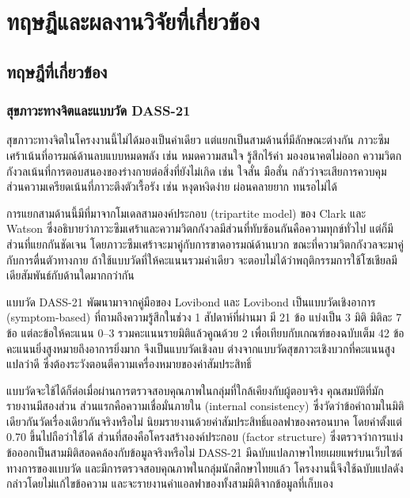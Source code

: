 \section{ทฤษฎีและผลงานวิจัยที่เกี่ยวข้อง}


\subsection{ทฤษฎีที่เกี่ยวข้อง}

\subsubsection*{สุขภาวะทางจิตและแบบวัด DASS-21}

สุขภาวะทางจิตในโครงงานนี้ไม่ได้มองเป็นค่าเดียว แต่แยกเป็นสามด้านที่มีลักษณะต่างกัน
ภาวะซึมเศร้าเน้นที่อารมณ์ด้านลบแบบหมดพลัง เช่น หมดความสนใจ รู้สึกไร้ค่า มองอนาคตไม่ออก
ความวิตกกังวลเน้นที่การตอบสนองของร่างกายต่อสิ่งที่ยังไม่เกิด เช่น ใจสั่น มือสั่น กลัวว่าจะเสียการควบคุม
ส่วนความเครียดเน้นที่ภาวะตึงตัวเรื้อรัง เช่น หงุดหงิดง่าย ผ่อนคลายยาก ทนรอไม่ได้

การแยกสามด้านนี้มีที่มาจากโมเดลสามองค์ประกอบ (tripartite model) ของ Clark และ Watson
\cite{clark1991tripartite} ซึ่งอธิบายว่าภาวะซึมเศร้าและความวิตกกังวลมีส่วนที่ทับซ้อนกันคือความทุกข์ทั่วไป
แต่ก็มีส่วนที่แยกกันชัดเจน โดยภาวะซึมเศร้าจะมาคู่กับการขาดอารมณ์ด้านบวก
ขณะที่ความวิตกกังวลจะมาคู่กับการตื่นตัวทางกาย
ถ้าใช้แบบวัดที่ให้คะแนนรวมค่าเดียว
จะตอบไม่ได้ว่าพฤติกรรมการใช้โซเชียลมีเดียสัมพันธ์กับด้านใดมากกว่ากัน

แบบวัด DASS-21 พัฒนามาจากคู่มือของ Lovibond และ Lovibond \cite{lovibond1995manual}
เป็นแบบวัดเชิงอาการ (symptom-based) ที่ถามถึงความรู้สึกในช่วง 1 สัปดาห์ที่ผ่านมา
มี 21 ข้อ แบ่งเป็น 3 มิติ มิติละ 7 ข้อ แต่ละข้อให้คะแนน 0--3
รวมคะแนนรายมิติแล้วคูณด้วย 2 เพื่อเทียบกับเกณฑ์ของฉบับเต็ม 42 ข้อ
คะแนนยิ่งสูงหมายถึงอาการยิ่งมาก จึงเป็นแบบวัดเชิงลบ
ต่างจากแบบวัดสุขภาวะเชิงบวกที่คะแนนสูงแปลว่าดี ซึ่งต้องระวังตอนตีความเครื่องหมายของค่าสัมประสิทธิ์

แบบวัดจะใช้ได้ก็ต่อเมื่อผ่านการตรวจสอบคุณภาพในกลุ่มที่ใกล้เคียงกับผู้ตอบจริง
คุณสมบัติที่มักรายงานมีสองส่วน ส่วนแรกคือความเชื่อมั่นภายใน (internal consistency)
ซึ่งวัดว่าข้อคำถามในมิติเดียวกันวัดเรื่องเดียวกันจริงหรือไม่ นิยมรายงานด้วยค่าสัมประสิทธิ์แอลฟาของครอนบาค
โดยค่าตั้งแต่ 0.70 ขึ้นไปถือว่าใช้ได้ ส่วนที่สองคือโครงสร้างองค์ประกอบ (factor structure)
ซึ่งตรวจว่าการแบ่งข้อออกเป็นสามมิติสอดคล้องกับข้อมูลจริงหรือไม่
DASS-21 มีฉบับแปลภาษาไทยเผยแพร่บนเว็บไซต์ทางการของแบบวัด \cite{webster2008thai}
และมีการตรวจสอบคุณภาพในกลุ่มนักศึกษาไทยแล้ว \cite{wittayapun2023validation}
โครงงานนี้จึงใช้ฉบับแปลดังกล่าวโดยไม่แก้ไขข้อความ และจะรายงานค่าแอลฟาของทั้งสามมิติจากข้อมูลที่เก็บเอง


